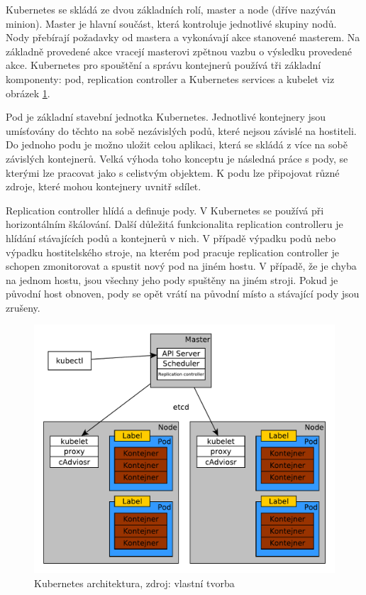 Kubernetes se skládá ze dvou základních rolí, master a node (dříve nazýván minion). Master je hlavní součást, která kontroluje jednotlivé skupiny nodů. Nody přebírají požadavky od mastera a vykonávají  akce stanovené masterem. Na základně provedené akce vracejí masterovi zpětnou vazbu o výsledku provedené akce. Kubernetes pro spouštění a správu kontejnerů používá tři základní komponenty: pod, replication controller a Kubernetes services a kubelet viz obrázek \ref{fig:kube_arch}.

Pod je základní stavební jednotka Kubernetes. Jednotlivé kontejnery jsou umísťovány do těchto na sobě nezávislých podů, které nejsou závislé na hostiteli. Do jednoho podu je možno uložit celou aplikaci, která se skládá z více na sobě závislých kontejnerů. Velká výhoda toho konceptu je následná práce s pody, se kterými lze pracovat jako s celistvým objektem. K podu lze připojovat různé zdroje, které mohou kontejnery uvnitř sdílet. 

Replication controller hlídá a definuje pody. V Kubernetes se používá při horizontálním škálování. Další důležitá funkcionalita replication controlleru je hlídání stávajících podů a kontejnerů v nich. V případě výpadku podů nebo výpadku hostitelského stroje, na kterém pod pracuje replication controller je schopen zmonitorovat a spustit nový pod na jiném hostu. V případě, že je chyba na jednom hostu, jsou všechny jeho pody spuštěny na jiném stroji. Pokud je původní host obnoven, pody se opět vrátí na původní místo a stávající pody jsou zrušeny.

\begin{figure}[H]
\begin{centering}
\includegraphics[width=1.0\textwidth]{img/kubernetes}
\par\end{centering}
\caption{Kubernetes architektura, zdroj: vlastní tvorba \label{fig:kube_arch}}
\end{figure}

